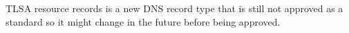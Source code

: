 
TLSA resource records is a new DNS record type that is still not approved as a standard so it might change in the future before being approved.












